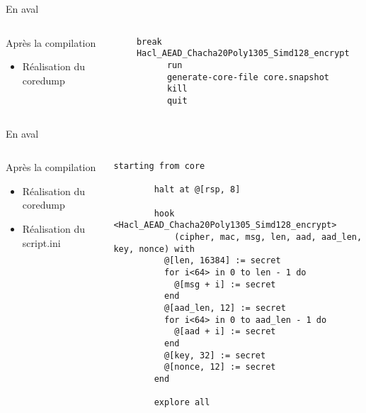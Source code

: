 \documentclass[A4,svgnames,9pt,aspectratio=169]{beamer}
\begin{document}
\begin{frame}[fragile]{En aval}

  \begin{columns}
    \begin{column}{0.3\textwidth}
      \begin{block}{Après la compilation}
        \begin{itemize}
          \item Réalisation du coredump
        \end{itemize}
      \end{block}      
    \end{column}
  
  
    \begin{column}{0.7\textwidth}
    \begin{lstlisting}[style=GDBStyle, caption={script\_dump}, gobble=6]
      break Hacl_AEAD_Chacha20Poly1305_Simd128_encrypt
      run
      generate-core-file core.snapshot
      kill
      quit
    \end{lstlisting}
    \end{column}
    \end{columns}
  
\end{frame}
\begin{frame}{En aval}

  \begin{columns}
    \begin{column}{0.3\textwidth}
      \begin{block}{Après la compilation}
        \begin{itemize}
          \item Réalisation du coredump
          \item Réalisation du script.ini
        \end{itemize}
      \end{block}      
    \end{column}
  
  
    \begin{column}{0.7\textwidth}
      \begin{lstlisting}[style=INIStyle, caption={study.ini}, label={lst:ini}, gobble=8]
        starting from core

        halt at @[rsp, 8]

        hook <Hacl_AEAD_Chacha20Poly1305_Simd128_encrypt>
            (cipher, mac, msg, len, aad, aad_len, key, nonce) with
          @[len, 16384] := secret
          for i<64> in 0 to len - 1 do
            @[msg + i] := secret
          end
          @[aad_len, 12] := secret
          for i<64> in 0 to aad_len - 1 do
            @[aad + i] := secret
          end
          @[key, 32] := secret
          @[nonce, 12] := secret
        end

        explore all
    \end{lstlisting}
    \end{column}
    \end{columns}
  
\end{frame}
\end{document}
